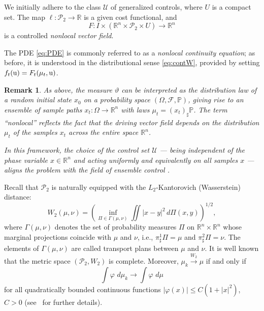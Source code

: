 \documentclass[sn-mathphys-num]{sn-jnl}
\numberwithin{equation}{section}
\theoremstyle{mythm}
\theoremstyle{mydef}
\newtheorem{remark}[proposition]{Remark}
\renewcommand{\phi}{\varphi}
\renewcommand{\d}{\,d}
\begin{document}
We initially adhere to the class \( \mathcal{U} \) of generalized controls, where \( U \) is a compact set. The map \( \ell \colon \mathcal{P}_2 \to \mathbb{R} \) is a given cost functional, and \[ F \colon I \times (\mathbb{R}^n \times \mathcal{P}_2 \times U) \to \mathbb{R}^n \] is a controlled \emph{nonlocal vector field}. 

The PDE \eqref{eq:PDE} is commonly referred to as a \emph{nonlocal continuity equation}; as before, it is understood in the distributional sense  \eqref{eq:contW}, provided by setting $f_t({\rm u})=F_t(\mu_t, {\rm u})$.

\begin{remark}
As above, the measure \( \vartheta \) can be interpreted as the distribution law of a random initial state \( x_0 \) on a probability space \( (\Omega, \mathcal{F}, \mathbb{P}) \), giving rise to an ensemble of sample paths \( x_t \colon \Omega \to \mathbb{R}^n \) with laws \( \mu_t = (x_t)_\sharp \mathbb{P} \). The term ``nonlocal'' reflects the fact that the driving vector field depends on the distribution \( \mu_t \) of the samples \( x_t \) across the entire space \( \mathbb{R}^n \).

In this framework, the choice of the control set \( \mathcal{U} \) --- being independent of the phase variable \( x \in \mathbb{R}^n \) and acting uniformly and equivalently on all samples \( x \) --- aligns the problem with the field of ensemble control \cite{liEnsembleControlFiniteDimensional2011}.
\end{remark}



Recall that \( \mathcal{P}_2 \) is naturally equipped with the \( L_2 \)-Kantorovich (Wasserstein) distance:
\[
  W_2(\mu, \nu) = \left(\inf_{\Pi \in \Gamma(\mu, \nu)} \iint |x-y|^2 \d \Pi(x, y)\right)^{1/2},
\]
where \( \Gamma(\mu, \nu) \) denotes the set of probability measures \( \Pi \) on \( \mathbb{R}^n \times \mathbb{R}^n \) whose marginal projections coincide with \( \mu \) and \( \nu \), i.e., \( \pi^1_{\sharp} \Pi = \mu \) and \( \pi^2_{\sharp} \Pi = \nu \).
The elements of \( \Gamma(\mu, \nu) \) are called transport plans between \( \mu \) and \( \nu \). It is well known that the metric space \( (\mathcal{P}_2, W_2) \) is complete. Moreover, \( \mu_k \overset{W_2}{\to} \mu \) if and only if 
$$\int \phi \, \d\mu_k \to \int \phi \, \d\mu$$ 
for all quadratically bounded continuous functions  
\(
  |\phi(x)| \leq C \left(1+|x|^2\right)\), \(C > 0
\)
(see~\cite{ambrosioGradientFlowsMetric2005, panaretosInvitationStatisticsWasserstein2020, santambrogioOptimalTransportApplied2015} for further details).
\end{document}
